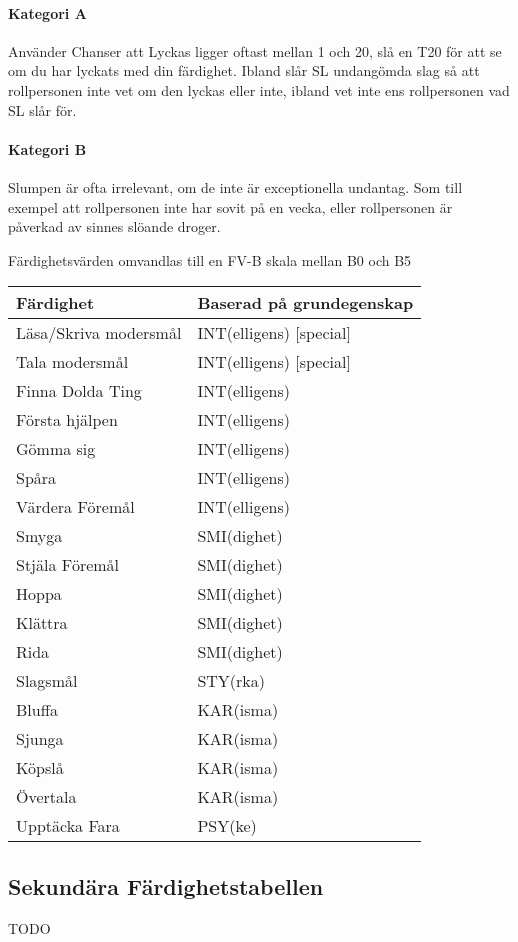 \documentclass[a4paper, 10pt, titlepage]{article}
\begin{document}
\paragraph{Kategori A} Använder Chanser att Lyckas ligger oftast mellan 1 och 20, slå en T20 för att
se om du har lyckats med din färdighet. Ibland slår SL undangömda slag så att rollpersonen inte vet om
den lyckas eller inte, ibland vet inte ens rollpersonen vad SL slår för.

\paragraph{Kategori B} Slumpen är ofta irrelevant, om de inte är exceptionella undantag. Som till exempel
att rollpersonen inte har sovit på en vecka, eller rollpersonen är påverkad av sinnes slöande droger.

Färdighetsvärden omvandlas till en FV-B skala mellan B0 och B5

\begin{table}[hbp]
  \begin{tabular}{|l|l|}
    \hline
    Färdighet         & Baserad på grundegenskap \\
    \hline
    Läsa/Skriva modersmål & INT(elligens) [special] \\
    Tala modersmål        & INT(elligens) [special] \\
    Finna Dolda Ting  & INT(elligens) \\
    Första hjälpen    & INT(elligens) \\
    Gömma sig         & INT(elligens) \\
    Spåra             & INT(elligens) \\
    Värdera Föremål   & INT(elligens) \\
    Smyga             & SMI(dighet) \\
    Stjäla Föremål    & SMI(dighet) \\
    Hoppa             & SMI(dighet)   \\
    Klättra           & SMI(dighet)   \\
    Rida              & SMI(dighet) \\
    Slagsmål          & STY(rka) \\
    Bluffa            & KAR(isma) \\
    Sjunga            & KAR(isma) \\
    Köpslå            & KAR(isma)  \\
    Övertala          & KAR(isma) \\
    Upptäcka Fara     & PSY(ke) \\
  \end{tabular}
\end{table}

\subsection{Sekundära Färdighetstabellen}

TODO
\end{document}
